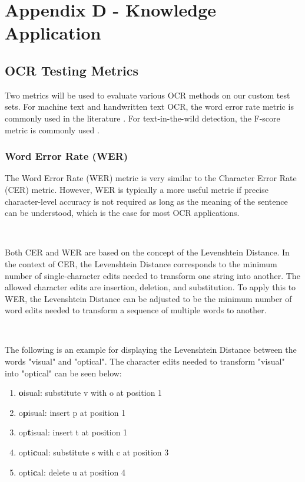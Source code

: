 \documentclass[a4paper,11pt]{article}
\begin{document}
\begin{center}
\end{center}

\newpage
\section{Appendix D - Knowledge Application}
\label{appendix-D}
\subsection{OCR Testing Metrics}
Two metrics will be used to evaluate various OCR methods on our custom test sets. For machine text and handwritten text OCR, the word error rate metric is commonly used in the literature \cite{wer-metric}. For text-in-the-wild detection, the F-score metric is commonly used \cite{scene-text-rec}.

\subsubsection{Word Error Rate (WER)}
The Word Error Rate (WER) metric is very similar to the Character Error Rate (CER) metric. However, WER is typically a more useful metric if precise character-level accuracy is not required as long as the meaning of the sentence can be understood, which is the case for most OCR applications.

\

\noindent
Both CER and WER are based on the concept of the Levenshtein Distance. In the context of CER, the Levenshtein Distance corresponds to the minimum number of single-character edits needed to transform one string into another. The allowed character edits are insertion, deletion, and substitution. To apply this to WER, the Levenshtein Distance can be adjusted to be the minimum number of word edits needed to transform a sequence of multiple words to another. \cite{wer-metric}

\

\noindent
The following is an example for displaying the Levenshtein Distance between the words "visual" and "optical". The character edits needed to transform "visual" into "optical" can be seen below:
\begin{enumerate}
  \item \textbf{o}isual: substitute v with o at position 1
  \item o\textbf{p}isual: insert p at position 1
  \item op\textbf{t}isual: insert t at position 1
  \item opti\textbf{c}ual: substitute s with c at position 3
  \item opti\textbf{c}al: delete u at position 4
\end{enumerate}
\end{document}
